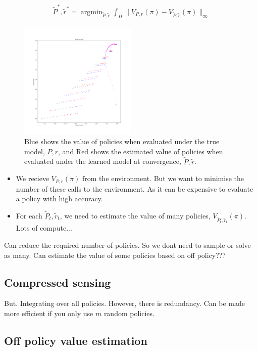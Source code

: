 \begin{align}
\tilde P^{* }, \tilde r^{* } = \mathop{\text{argmin}}_{\tilde P, \tilde r} \int_{\Pi} \parallel V_{P, r}(\pi)-V_{\tilde P, \tilde r}(\pi) \parallel_\infty
\end{align}

\begin{figure}
\centering
\includegraphics[width=0.5\textwidth,height=0.5\textheight]{../../pictures/figures/model_iteration.png}
\caption{Blue shows the value of policies when evaluated under the true model, $P, r$,
and Red shows the estimated value of policies when evaluated under the learned model at convergence, $\tilde P, \tilde r$.}
\end{figure}

\begin{itemize}
  \item We recieve $V_{P, r}(\pi)$ from the environment. But we want to minimise the number of these calls to the environment.
  As it can be expensive to evaluate a policy with high accuracy.
  \item For each $\tilde P_t, \tilde r_t$, we need to estimate the value of many policies, $V_{\tilde P_t, \tilde r_t}(\pi)$. Lots of compute...
\end{itemize}

Can reduce the required number of policies. So we dont need to sample or solve as many.
Can estimate the value of some policies based on off policy???

\subsection{Compressed sensing}

But. Integrating over all policies. However, there is redundancy.
Can be made more efficient if you only use $m$ random policies.

\subsection{Off policy value estimation}

